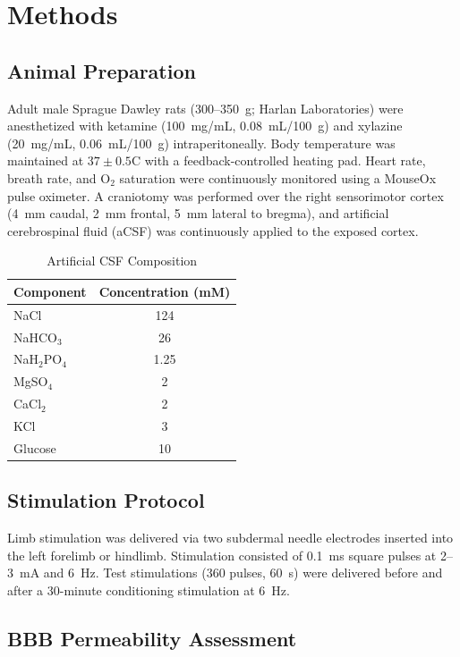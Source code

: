 \documentclass[11pt]{article}
\begin{document}
\section{Methods}

\subsection{Animal Preparation}

Adult male Sprague Dawley rats (300--350~g; Harlan Laboratories) were anesthetized with ketamine (100~mg/mL, 0.08~mL/100~g) and xylazine (20~mg/mL, 0.06~mL/100~g) intraperitoneally. Body temperature was maintained at $37 \pm 0.5$\textdegree C with a feedback-controlled heating pad. Heart rate, breath rate, and O$_2$ saturation were continuously monitored using a MouseOx pulse oximeter. A craniotomy was performed over the right sensorimotor cortex (4~mm caudal, 2~mm frontal, 5~mm lateral to bregma), and artificial cerebrospinal fluid (aCSF) was continuously applied to the exposed cortex.

\begin{table}[ht]
\centering
\caption{Artificial CSF Composition}
\label{tab:acsf}
\begin{tabular}{lc}
\toprule
\textbf{Component} & \textbf{Concentration (mM)} \\
\midrule
NaCl & 124 \\
NaHCO$_3$ & 26 \\
NaH$_2$PO$_4$ & 1.25 \\
MgSO$_4$ & 2 \\
CaCl$_2$ & 2 \\
KCl & 3 \\
Glucose & 10 \\
\bottomrule
\end{tabular}
\end{table}

\subsection{Stimulation Protocol}

Limb stimulation was delivered via two subdermal needle electrodes inserted into the left forelimb or hindlimb. Stimulation consisted of 0.1~ms square pulses at 2--3~mA and 6~Hz. Test stimulations (360 pulses, 60~s) were delivered before and after a 30-minute conditioning stimulation at 6~Hz.

\subsection{BBB Permeability Assessment}
\end{document}
